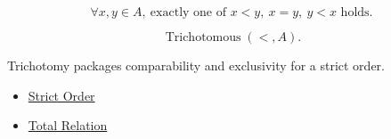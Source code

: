 \begin{remark*}
\[
\forall x,y\in A,\ \text{exactly one of }x<y,\ x=y,\ y<x\text{ holds}.
\]
\end{remark*}

\begin{remark*}
\[
\operatorname{Trichotomous}(<,A).
\]
\end{remark*}

\begin{remark*}[Interpretation]
Trichotomy packages comparability and exclusivity for a strict order.
\end{remark*}

\begin{dependencies}
\begin{itemize}
  \item \hyperref[def:strict-order]{Strict Order}
  \item \hyperref[def:total-rel]{Total Relation}
\end{itemize}
\end{dependencies}
